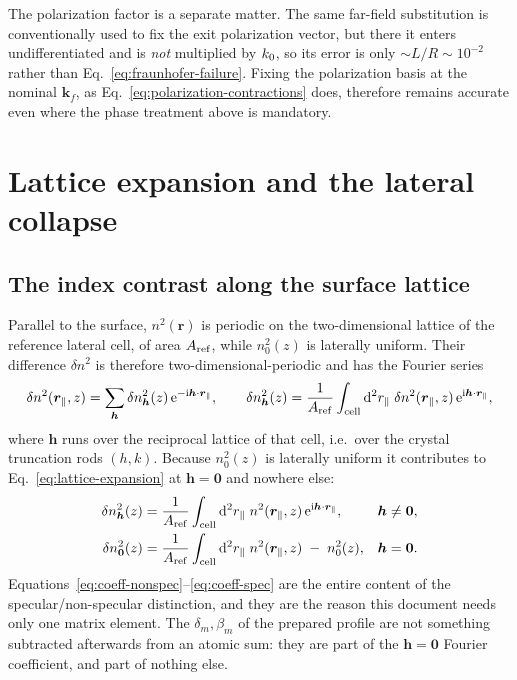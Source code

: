 The polarization factor is a separate matter.  The same far-field substitution
is conventionally used to fix the exit polarization vector, but there it enters
undifferentiated and is \emph{not} multiplied by $k_0$, so its error is only
$\sim L/R\sim10^{-2}$ rather than Eq.~\eqref{eq:fraunhofer-failure}.  Fixing the
polarization basis at the nominal $\bm k_f$, as
Eq.~\eqref{eq:polarization-contractions} does, therefore remains accurate even
where the phase treatment above is mandatory.

\section{Lattice expansion and the lateral collapse}
\label{sec:collapse}

\subsection{The index contrast along the surface lattice}

Parallel to the surface, $n^2(\bm r)$ is periodic on the two-dimensional
lattice of the reference lateral cell, of area $A_{\rm ref}$, while $n_0^2(z)$
is laterally uniform.  Their difference $\delta n^2$ is therefore
two-dimensional-periodic and has the Fourier series
\begin{equation}
  \delta n^2(\bm{r}_{\parallel},z)=\sum_{\bm h}\delta n^2_{\bm h}(z)\,
  \mathrm{e}^{-\mathrm{i}\bm h\cdot\bm{r}_{\parallel}},
  \qquad
  \delta n^2_{\bm h}(z)
  =\frac{1}{A_{\rm ref}}\int_{\rm cell}\mathop{}\!\mathrm{d}^2r_\parallel\;
   \delta n^2(\bm{r}_{\parallel},z)\,\mathrm{e}^{\mathrm{i}\bm h\cdot\bm{r}_{\parallel}},
  \label{eq:lattice-expansion}
\end{equation}
where $\bm h$ runs over the reciprocal lattice of that cell, i.e.\ over the
crystal truncation rods $(h,k)$.  Because $n_0^2(z)$ is laterally uniform it
contributes to Eq.~\eqref{eq:lattice-expansion} at $\bm h=\bm 0$ and nowhere
else:
\begin{align}
  \delta n^2_{\bm h}(z)
  &=\frac{1}{A_{\rm ref}}\int_{\rm cell}\mathop{}\!\mathrm{d}^2r_\parallel\;n^2(\bm{r}_{\parallel},z)\,
    \mathrm{e}^{\mathrm{i}\bm h\cdot\bm{r}_{\parallel}},
  &&\bm h\neq\bm0,
  \label{eq:coeff-nonspec}\\
  \delta n^2_{\bm 0}(z)
  &=\frac{1}{A_{\rm ref}}\int_{\rm cell}\mathop{}\!\mathrm{d}^2r_\parallel\;n^2(\bm{r}_{\parallel},z)
    \;-\;n_0^2(z),
  &&\bm h=\bm 0.
  \label{eq:coeff-spec}
\end{align}
Equations~\eqref{eq:coeff-nonspec}--\eqref{eq:coeff-spec} are the entire
content of the specular/non-specular distinction, and they are the reason this
document needs only one matrix element.  The $\delta_m,\beta_m$ of the prepared
profile are not something subtracted afterwards from an atomic sum: they are
part of the $\bm h=\bm 0$ Fourier coefficient, and part of nothing else.

